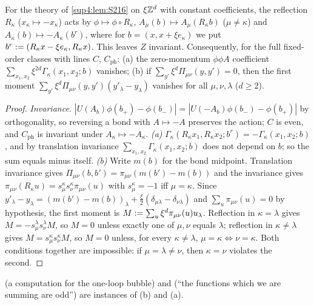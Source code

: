 \begin{lemma}\label{sup4:lem:S217}
For the theory of \cref{sup4:lem:S216} on $\xi\mathbb Z^d$ with constant coefficients, the reflection $R_\kappa$ ($x_\kappa\mapsto-x_\kappa$) acts by $\phi\mapsto\phi\circ R_\kappa$, $A_\mu(b)\mapsto A_\mu(R_\kappa b)$ ($\mu\ne\kappa$) and $A_\kappa(b)\mapsto-A_\kappa(b^r)$, where for $b=(x,x+\xi e_\kappa)$ we put $b^r:=(R_\kappa x-\xi e_\kappa,R_\kappa x)$. This leaves $Z$ invariant. Consequently, for the full fixed-order classes with lines $C$, $C_{\mathrm{ph}}$: \textup{(a)} the zero-momentum $\phi\phi A$ coefficient $\sum_{x_1,x_2}\xi^{2d}\Gamma_\kappa(x_1,x_2;b)$ vanishes; \textup{(b)} if $\sum_{y'}\xi^d\Pi_{\mu\nu}(y,y')=0$, then the first moment $\sum_{y'}\xi^d\Pi_{\mu\nu}(y,y')(y'_\lambda-y_\lambda)$ vanishes for all $\mu,\nu,\lambda$ ($d\ge2$).
\end{lemma}

\begin{proof}
\emph{Invariance.} $|U(A_b)\phi(b_+)-\phi(b_-)|=|U(-A_b)\phi(b_-)-\phi(b_+)|$ by orthogonality, so reversing a bond with $A\mapsto-A$ preserves the action; $C$ is even, and $C_{\mathrm{ph}}$ is invariant under $A_\kappa\mapsto-A_\kappa$. \emph{(a)} $\Gamma_\kappa(R_\kappa x_1,R_\kappa x_2;b^r)=-\Gamma_\kappa(x_1,x_2;b)$, and by translation invariance $\sum_{x_1,x_2}\Gamma_\kappa(x_1,x_2;b)$ does not depend on $b$; so the sum equals minus itself. \emph{(b)} Write $m(b)$ for the bond midpoint. Translation invariance gives $\Pi_{\mu\nu}(b,b')=\pi_{\mu\nu}(m(b')-m(b))$ and the invariance gives $\pi_{\mu\nu}(R_\kappa u)=s^\kappa_\mu s^\kappa_\nu\pi_{\mu\nu}(u)$ with $s^\kappa_\mu=-1$ iff $\mu=\kappa$. Since $y'_\lambda-y_\lambda=(m(b')-m(b))_\lambda+\frac\xi2(\delta_{\mu\lambda}-\delta_{\nu\lambda})$ and $\sum_u\pi_{\mu\nu}(u)=0$ by hypothesis, the first moment is $M:=\sum_u\xi^d\pi_{\mu\nu}(u)u_\lambda$. Reflection in $\kappa=\lambda$ gives $M=-s^\lambda_\mu s^\lambda_\nu M$, so $M=0$ unless exactly one of $\mu,\nu$ equals $\lambda$; reflection in $\kappa\ne\lambda$ gives $M=s^\kappa_\mu s^\kappa_\nu M$, so $M=0$ unless, for every $\kappa\ne\lambda$, $\mu=\kappa\Leftrightarrow\nu=\kappa$. Both conditions together are impossible: if $\mu=\lambda\ne\nu$, then $\kappa=\nu$ violates the second.
\end{proof}

\cite[(3.27)--(3.28)]{Ba3} (a computation for the one-loop bubble) and \cite[(3.37), (3.38)]{Ba3} (``the functions which we are summing are odd'') are instances of (b) and (a).
